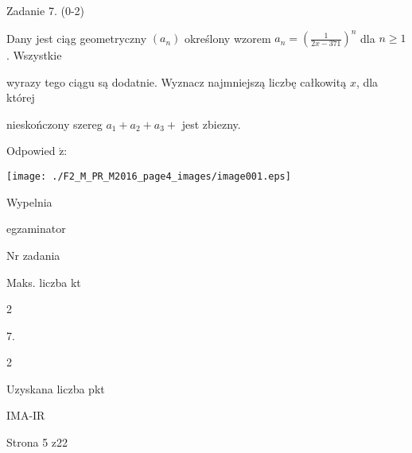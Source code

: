 \documentclass[a4paper,12pt]{article}
\begin{document}
Zadanie 7. (0-2)

Dany jest ciąg geometryczny $(a_{n})$ określony wzorem $a_{n}=(\displaystyle \frac{1}{2x-371})^{n}$ dla $n\geq 1$. Wszystkie

wyrazy tego ciągu są dodatnie. Wyznacz najmniejszą liczbę całkowitą $x$, dla której

nieskończony szereg $a_{1}+a_{2}+a_{3}+$ jest zbiezny.

Odpowied $\acute{\mathrm{z}}$:
\begin{center}
\texttt{[image: ./F2\_M\_PR\_M2016\_page4\_images/image001.eps]}
\end{center}
Wypelnia

egzaminator

Nr zadania

Maks. liczba kt

2

7.

2

Uzyskana liczba pkt

IMA-IR

Strona 5 z22
\end{document}
